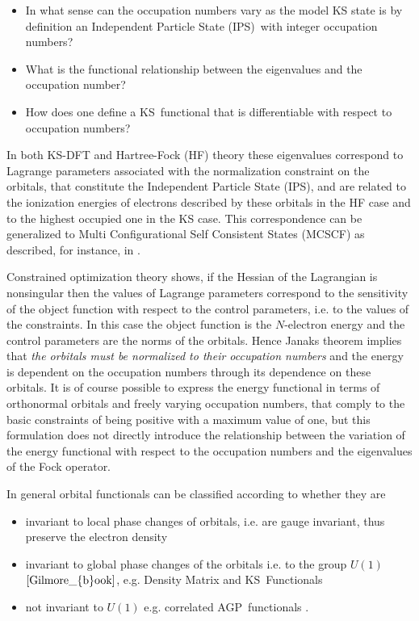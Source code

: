 \documentclass[aps,preprint]{revtex4}%
\begin{document}
\begin{itemize}
\item In what sense can the occupation numbers vary as the model KS state is
by definition an Independent Particle State (IPS)\ with integer occupation numbers?

\item What is the functional relationship between the eigenvalues and the
occupation number?

\item How does one define a KS\ functional that is differentiable with respect
to occupation numbers?
\end{itemize}

In both KS-DFT and Hartree-Fock (HF) theory these eigenvalues correspond to
Lagrange parameters associated with the normalization constraint on the
orbitals, that constitute the Independent Particle State (IPS), and are
related to the ionization energies of electrons described by\textit{ }these
orbitals in the HF case and to the highest occupied one in the KS case. This
correspondence can be generalized to Multi Configurational Self Consistent
States (MCSCF) as described, for instance, in \cite{OrtizWeiner2006}.

Constrained optimization theory \cite{Hestenes75} shows, if the Hessian of the
Lagrangian is nonsingular then the values of Lagrange parameters correspond to
the sensitivity of the object function with respect to the control parameters,
i.e. to the values of the constraints. In this case the object function is the
$N$-electron energy and the control parameters are the norms of the orbitals.
Hence Janaks theorem implies that\emph{ the orbitals must be normalized to
their occupation numbers }and the energy is dependent on the occupation
numbers through its dependence on these orbitals. It is of course possible to
express the energy functional in terms of orthonormal orbitals and freely
varying occupation numbers, that comply to the basic constraints of being
positive with a maximum value of one, but this formulation does not directly
introduce the relationship between the variation of the energy functional with
respect to the occupation numbers and the eigenvalues of the Fock operator.

In general orbital functionals can be classified according to whether they are

\begin{itemize}
\item invariant to local phase changes of orbitals, i.e. are gauge invariant,
thus preserve the electron density

\item invariant to global phase changes of the orbitals i.e. to the group
$U\left(  1\right)  $ $\cite{Gilmore_{b}ook}$, e.g. Density Matrix and KS\ Functionals

\item not invariant to $U\left(  1\right)  $ e.g. correlated AGP\ functionals
\cite{OrtizWeiner2006}.
\end{itemize}
\end{document}

